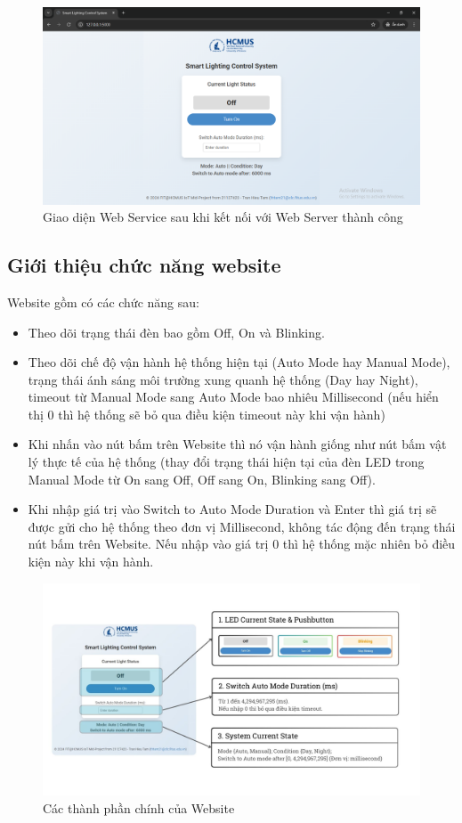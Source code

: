 \begin{figure}[!h]
    \centering
    \includegraphics[width=0.75\linewidth]{img/WebUXUI.png}
    \caption{Giao diện Web Service sau khi kết nối với Web Server thành công}
    \label{fig:enter-label}
\end{figure}

\subsection{Giới thiệu chức năng website}
Website gồm có các chức năng sau: 
\begin{itemize}
    \item Theo dõi trạng thái đèn bao gồm Off, On và Blinking.
    \item Theo dõi chế độ vận hành hệ thống hiện tại (Auto Mode hay Manual Mode), trạng thái ánh sáng môi trường xung quanh hệ thống (Day hay Night), timeout từ Manual Mode sang Auto Mode bao nhiêu Millisecond (nếu hiển thị 0 thì hệ thống sẽ bỏ qua điều kiện timeout này khi vận hành)
    \item Khi nhấn vào nút bấm trên Website thì nó vận hành giống như nút bấm vật lý thực tế của hệ thống (thay đổi trạng thái hiện tại của đèn LED trong Manual Mode từ On sang Off, Off sang On, Blinking sang Off).
    \item Khi nhập giá trị vào Switch to Auto Mode Duration và Enter thì giá trị sẽ được gửi cho hệ thống theo đơn vị Millisecond, không tác động đến trạng thái nút bấm trên Website. Nếu nhập vào giá trị 0 thì hệ thống mặc nhiên bỏ điều kiện này khi vận hành.
\end{itemize}

\begin{figure}[!h]
    \centering
    \includegraphics[width=0.8\linewidth]{img/Web.jpg}
    \caption{Các thành phần chính của Website}
    \label{fig:enter-label}
\end{figure}


